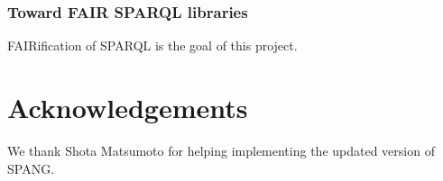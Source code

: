 \documentclass[runningheads]{llncs}
\begin{document}
\subsubsection{Toward FAIR SPARQL libraries}
FAIRification of SPARQL is the goal of this project.



\section*{Acknowledgements}
We thank Shota Matsumoto for helping implementing the updated version of SPANG.






\end{document}

